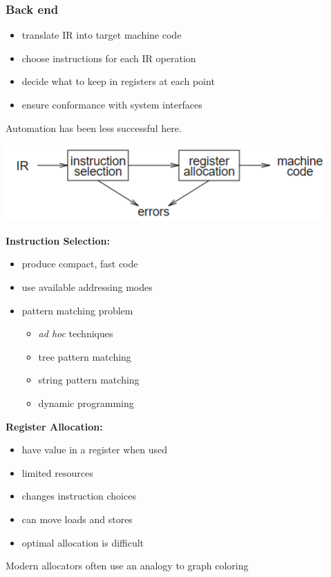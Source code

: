 \documentclass[10pt]{article}
\begin{document}
\subsubsection*{Back end}
\begin{itemize}
    \item translate IR into target machine code
    \item choose instructions for each IR operation
    \item decide what to keep in registers at each point
    \item ensure conformance with system interfaces
\end{itemize}
Automation has been less successful here.
\begin{center}
    \includegraphics*[scale=1]{W1_4.png}
\end{center}
\textbf{Instruction Selection:}
\begin{itemize}
    \item produce compact, fast code
    \item use available addressing modes
    \item pattern matching problem
    \begin{itemize}
        \item \textit{ad hoc} techniques
        \item tree pattern matching
        \item string pattern matching
        \item dynamic programming
    \end{itemize}
\end{itemize}
\textbf{Register Allocation:}
\begin{itemize}
    \item have value in a register when used
    \item limited resources
    \item changes instruction choices
    \item can move loads and stores
    \item optimal allocation is difficult
\end{itemize}
Modern allocators often use an analogy to graph coloring
\end{document}
